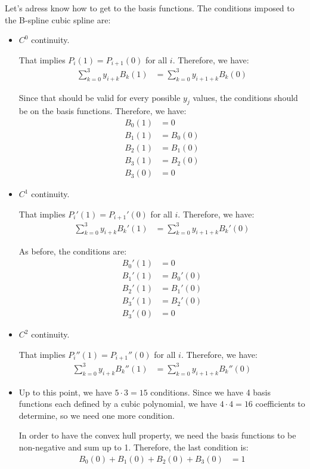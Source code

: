 Let's adress know how to get to the basis functions. The conditions imposed to the B-spline cubic spline are:
\begin{itemize}
    \item $C^0$ continuity.
    
    That implies $P_i(1) = P_{i+1}(0)$ for all $i$. Therefore, we have:
    \begin{align*}
        \sum_{k=0}^{3} y_{i+k} B_k(1) &= \sum_{k=0}^{3} y_{i+1+k} B_k(0)
    \end{align*}

    Since that should be valid for every possible $y_j$ values, the conditions should be on the basis functions. Therefore, we have:
    \begin{align*}
        B_0(1) &= 0 \\
        B_1(1) &= B_0(0) \\
        B_2(1) &= B_1(0) \\
        B_3(1) &= B_2(0) \\
        B_3(0) &= 0
    \end{align*}

    \item $C^1$ continuity.
    
    That implies $P_i'(1) = P_{i+1}'(0)$ for all $i$. Therefore, we have:
    \begin{align*}
        \sum_{k=0}^{3} y_{i+k} B_k'(1) &= \sum_{k=0}^{3} y_{i+1+k} B_k'(0)
    \end{align*}

    As before, the conditions are:
    \begin{align*}
        B_0'(1) &= 0 \\
        B_1'(1) &= B_0'(0) \\
        B_2'(1) &= B_1'(0) \\
        B_3'(1) &= B_2'(0) \\
        B_3'(0) &= 0
    \end{align*}

    \item $C^2$ continuity.
    
    That implies $P_i''(1) = P_{i+1}''(0)$ for all $i$. Therefore, we have:
    \begin{align*}
        \sum_{k=0}^{3} y_{i+k} B_k''(1) &= \sum_{k=0}^{3} y_{i+1+k} B_k''(0)
    \end{align*}

    \item Up to this point, we have $5\cdot 3 = 15$ conditions. Since we have 4 basis functions each defined by a cubic polynomial, we have $4\cdot 4 = 16$ coefficients to determine, so we need one more condition.
    
    In order to have the convex hull property, we need the basis functions to be non-negative and sum up to 1. Therefore, the last condition is:
    \begin{align*}
        B_0(0) + B_1(0) + B_2(0) + B_3(0) &= 1
    \end{align*}
\end{itemize}

